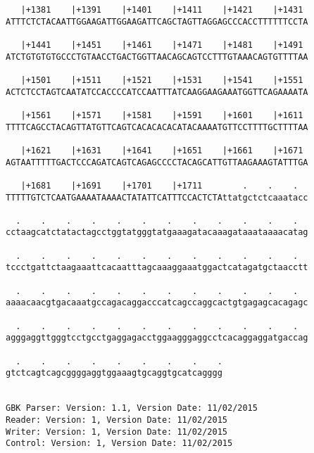 \documentclass{article}
\begin{document}
\begin{Verbatim}
   |+1381    |+1391    |+1401    |+1411    |+1421    |+1431 
ATTTCTCTACAATTGGAAGATTGGAAGATTCAGCTAGTTAGGAGCCCACCTTTTTTCCTA
                                                            
   |+1441    |+1451    |+1461    |+1471    |+1481    |+1491 
ATCTGTGTGTGCCCTGTAACCTGACTGGTTAACAGCAGTCCTTTGTAAACAGTGTTTTAA
                                                            
   |+1501    |+1511    |+1521    |+1531    |+1541    |+1551 
ACTCTCCTAGTCAATATCCACCCCATCCAATTTATCAAGGAAGAAATGGTTCAGAAAATA
                                                            
   |+1561    |+1571    |+1581    |+1591    |+1601    |+1611 
TTTTCAGCCTACAGTTATGTTCAGTCACACACACATACAAAATGTTCCTTTTGCTTTTAA
                                                            
   |+1621    |+1631    |+1641    |+1651    |+1661    |+1671 
AGTAATTTTTGACTCCCAGATCAGTCAGAGCCCCTACAGCATTGTTAAGAAAGTATTTGA
                                                            
   |+1681    |+1691    |+1701    |+1711        .    .    .  
TTTTTGTCTCAATGAAAATAAAACTATATTCATTTCCACTCTAttatgctctcaaatacc
                                                            
  .    .    .    .    .    .    .    .    .    .    .    .  
cctaagcatctatactagcctggtatgggtatgaaagatacaaagataaataaaacatag
                                                            
  .    .    .    .    .    .    .    .    .    .    .    .  
tccctgattctaagaaattcacaatttagcaaaggaaatggactcatagatgctaacctt
                                                            
  .    .    .    .    .    .    .    .    .    .    .    .  
aaaacaacgtgacaaatgccagacaggacccatcagccaggcactgtgagagcacagagc
                                                            
  .    .    .    .    .    .    .    .    .    .    .    .  
agggaggttgggtcctgcctgaggagacctggaagggaggcctcacaggaggatgaccag
                                                            
  .    .    .    .    .    .    .    .    .
gtctcagtcagcggggaggtggaaagtgcaggtgcatcagggg
                                           
                                           
GBK Parser: Version: 1.1, Version Date: 11/02/2015
Reader: Version: 1, Version Date: 11/02/2015
Writer: Version: 1, Version Date: 11/02/2015
Control: Version: 1, Version Date: 11/02/2015
\end{Verbatim}
\end{document}
